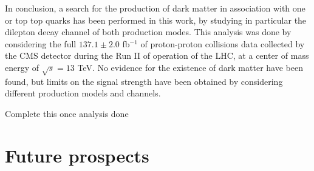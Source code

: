 \documentclass[a4paper, 10pt, openright]{report}
\begin{document}
In conclusion, a search for the production of dark matter in association with one or top top quarks has been performed in this work, by studying in particular the dilepton decay channel of both production modes. This analysis was done by considering the full $137.1 \pm 2.0$ fb$^{-1}$ of proton-proton collisions data collected by the \ac{CMS} detector during the Run II of operation of the \ac{LHC}, at a center of mass energy of $\sqrt{s} = 13$ TeV. No evidence for the existence of dark matter have been found, but limits on the signal strength have been obtained by considering different production models and channels.

\color{red} Complete this once analysis done \color{black}

\section{Future prospects}
\end{document}
